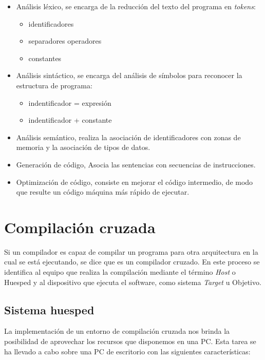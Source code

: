 \begin{itemize}
 \item Análisis léxico, se encarga de la reducción del texto del programa en
  \emph{tokens}:
    \begin{itemize}
      \item identificadores
      \item separadores operadores
      \item constantes
    \end{itemize}

  \item Análisis sintáctico, se encarga del análisis de símbolos para
  reconocer la estructura de programa:
  \begin{itemize}
   \item indentificador = expresión
   \item indentificador + constante
  \end{itemize}
  
  \item Análisis semántico, realiza la asociación de identificadores con zonas
  de memoria y la asociación de tipos de datos.

  \item Generación de código, Asocia las sentencias con secuencias de
  instrucciones.
  
  \item Optimización de código, consiste en mejorar el código intermedio, de
  modo que resulte un código máquina más rápido de ejecutar.

\end{itemize}

\section{Compilación cruzada}

Si un compilador es capaz de compilar un programa para otra arquitectura en la
cual se está ejecutando, se dice que es un compilador cruzado. En este proceso
se identifica al equipo que realiza la compilación mediante el término
\emph{Host} o Huesped y al dispositivo que ejecuta el software, como sistema
\emph{Target} u Objetivo\cite{building}.

\subsection{Sistema huesped}

La implementación de un entorno de compilación cruzada nos brinda la
posibilidad de aprovechar los recursos que disponemos en una PC. Esta tarea se
ha llevado a cabo sobre una PC de escritorio con las siguientes características:

